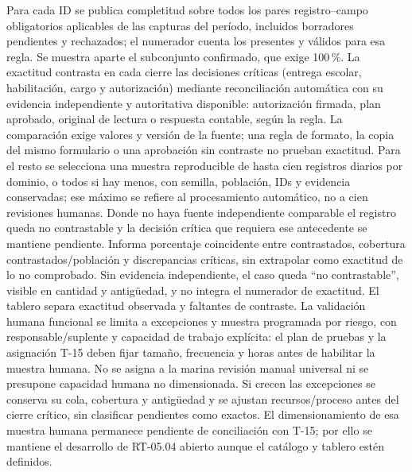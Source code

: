 Para cada ID se publica completitud sobre todos los pares registro--campo obligatorios aplicables de las capturas del período, incluidos borradores pendientes y rechazados; el numerador cuenta los presentes y válidos para esa regla. Se muestra aparte el subconjunto confirmado, que exige 100\,\%. La exactitud contrasta en cada cierre las decisiones críticas (entrega escolar, habilitación, cargo y autorización) mediante reconciliación automática con su evidencia independiente y autoritativa disponible: autorización firmada, plan aprobado, original de lectura o respuesta contable, según la regla. La comparación exige valores y versión de la fuente; una regla de formato, la copia del mismo formulario o una aprobación sin contraste no prueban exactitud. Para el resto se selecciona una muestra reproducible de hasta cien registros diarios por dominio, o todos si hay menos, con semilla, población, IDs y evidencia conservadas; ese máximo se refiere al procesamiento automático, no a cien revisiones humanas. Donde no haya fuente independiente comparable el registro queda no contrastable y la decisión crítica que requiera ese antecedente se mantiene pendiente. Informa porcentaje coincidente entre contrastados, cobertura contrastados/población y discrepancias críticas, sin extrapolar como exactitud de lo no comprobado. Sin evidencia independiente, el caso queda ``no contrastable'', visible en cantidad y antigüedad, y no integra el numerador de exactitud. El tablero separa exactitud observada y faltantes de contraste. La validación humana funcional se limita a excepciones y muestra programada por riesgo, con responsable/suplente y capacidad de trabajo explícita: el plan de pruebas y la asignación T-15 deben fijar tamaño, frecuencia y horas antes de habilitar la muestra humana. No se asigna a la marina revisión manual universal ni se presupone capacidad humana no dimensionada. Si crecen las excepciones se conserva su cola, cobertura y antigüedad y se ajustan recursos/proceso antes del cierre crítico, sin clasificar pendientes como exactos. El dimensionamiento de esa muestra humana permanece pendiente de conciliación con T-15; por ello se mantiene el desarrollo de RT-05.04 abierto aunque el catálogo y tablero estén definidos.

